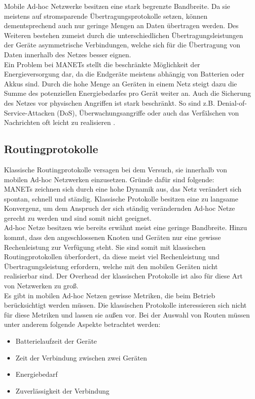 Mobile Ad-hoc Netzwerke besitzen eine stark begrenzte Bandbreite. Da sie meistens auf stromsparende Übertragungsprotokolle setzen, können dementsprechend auch nur geringe Mengen an Daten übertragen werden. Des Weiteren bestehen zumeist durch die unterschiedlichen Übertragungsleistungen der Geräte asymmetrische Verbindungen, welche sich für die Übertragung von Daten innerhalb des Netzes besser eignen.\\

Ein Problem bei MANETs stellt die beschränkte Möglichkeit der Energieversorgung dar, da die Endgeräte meistens abhängig von Batterien oder Akkus sind. Durch die hohe Menge an Geräten in einem Netz steigt dazu die Summe des potenziellen Energiebedarfes pro Gerät weiter an. Auch die Sicherung des Netzes vor physischen Angriffen ist stark beschränkt. So sind z.B. Denial-of-Service-Attacken (DoS), Überwachungsangriffe oder auch das Verfälschen von Nachrichten oft leicht zu realisieren \cite{d:timm}.

\subsection{Routingprotokolle}\label{ss:Routingprotokolle}

Klassische Routingprotokolle versagen bei dem Versuch, sie innerhalb von mobilen Ad-hoc Netzwerken einzusetzen. Gründe dafür sind folgende: \\

MANETs zeichnen sich durch eine hohe Dynamik aus, das Netz verändert sich spontan, schnell und ständig. Klassische Protokolle besitzen eine zu langsame Konvergenz, um dem Anspruch der sich ständig verändernden Ad-hoc Netze gerecht zu werden und sind somit nicht geeignet.\\

Ad-hoc Netze besitzen wie bereits erwähnt meist eine geringe Bandbreite. Hinzu kommt, dass den angeschlossenen Knoten und Geräten nur eine gewisse Rechenleistung zur Verfügung steht. Sie sind somit mit klassischen Routingprotokollen überfordert, da diese meist viel Rechenleistung und Übertragungsleistung erfordern, welche mit den mobilen Geräten nicht realisierbar sind. Der Overhead der klassischen Protokolle ist also für diese Art von Netzwerken zu groß. \\

Es gibt in mobilen Ad-hoc Netzen gewisse Metriken, die beim Betrieb berücksichtigt werden müssen. Die klassischen Protokolle interessieren sich nicht für diese Metriken und lassen sie außen vor. Bei der Auswahl von Routen müssen unter anderem folgende Aspekte betrachtet werden:
\begin{itemize}
	\item Batterielaufzeit der Geräte
	\item Zeit der Verbindung zwischen zwei Geräten
	\item Energiebedarf
	\item Zuverlässigkeit der Verbindung
\end{itemize} 

